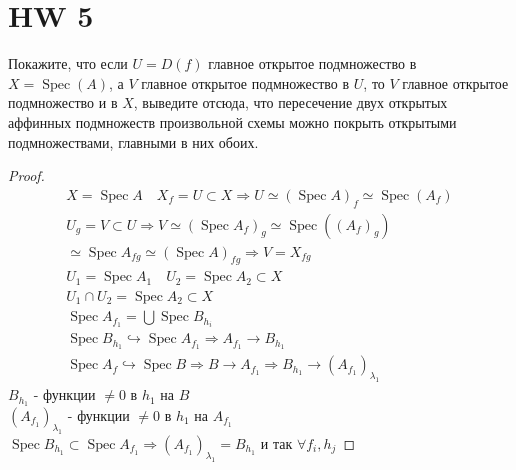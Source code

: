 \section{HW 5}

\begin{prob}
Покажите, что если $U=D(f)$ главное открытое подмножество в $X=\operatorname{Spec}(A)$, а $V$ главное открытое подмножество в $U$, то $V$ главное открытое подмножество и в $X$, выведите отсюда, что пересечение двух открытых аффинных подмножеств произвольной схемы можно покрыть открытыми подмножествами, главными в них обоих.
\end{prob}
\begin{proof}
\begin{gather*}
	X = \operatorname{Spec} A\quad
	X_f = U \subset X
	\Rightarrow U \simeq (\operatorname{Spec} A)_f \simeq \operatorname{Spec}(A_f)\\
	U_g = V \subset U \Rightarrow V \simeq (\operatorname{Spec} A_f)_g \simeq \operatorname{Spec}((A_f)_g)\\
	\simeq \operatorname{Spec} A_{fg} \simeq (\operatorname{Spec} A)_{fg} \Rightarrow V = X_{fg}\\
	U_1 = \operatorname{Spec} A_1\quad U_2 = \operatorname{Spec} A_2 \subset X\\
	U_1 \cap U_2 = \operatorname{Spec} A_2 \subset X\\
	\operatorname{Spec} A_{f_1} = \bigcup \operatorname{Spec} B_{h_i}\\
	\operatorname{Spec} B_{h_1} \hookrightarrow \operatorname{Spec} A_{f_1}
	\Rightarrow A_{f_1} \to B_{h_1}\\
	\operatorname{Spec} A_f \hookrightarrow \operatorname{Spec} B
	\Rightarrow B \to A_{f_1}
	\Rightarrow B_{h_1} \to (A_{f_1})_{\lambda_1}
\end{gather*}
$B_{h_1}$ - функции $\ne 0$ в $h_1$ на $B$\\
$(A_{f_1})_{\lambda_1}$ - функции $\ne 0$ в $h_1$ на $A_{f_1}$\\
$\operatorname{Spec} B_{h_1} \subset \operatorname{Spec} A_{f_1} \Rightarrow (A_{f_1})_{\lambda_1} = B_{h_1}$ и так $\forall f_i, h_j$ 
\end{proof}
\begin{comment}
\end{comment}
\vskip 0.6in





